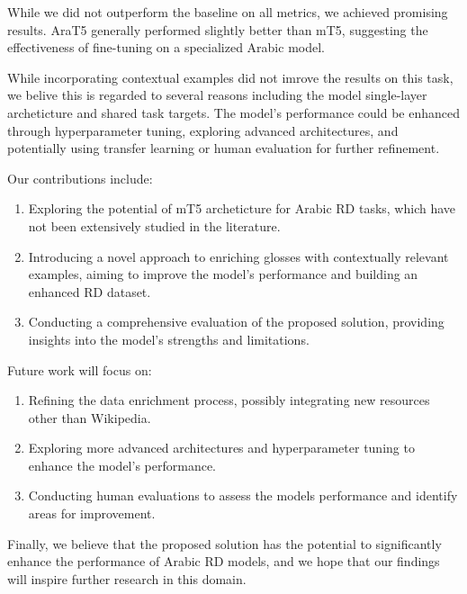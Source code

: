 \documentclass[12pt]{article}
\begin{document}
While we did not outperform the baseline on all metrics, we achieved promising results. AraT5 generally performed slightly better than mT5, suggesting the effectiveness of fine-tuning on a specialized Arabic model.

While incorporating contextual examples did not imrove the results on this task, we belive this is regarded to several reasons including the model single-layer archeticture and shared task targets. The model's performance could be enhanced through hyperparameter tuning, exploring advanced architectures, and potentially using transfer learning or human evaluation for further refinement.

Our contributions include:
\begin{enumerate}
    \item Exploring the potential of mT5 archeticture for Arabic RD tasks, which have not been extensively studied in the literature.
    \item Introducing a novel approach to enriching glosses with contextually relevant examples, aiming to improve the model's performance and building an enhanced RD dataset.
    \item Conducting a comprehensive evaluation of the proposed solution, providing insights into the model's strengths and limitations.
\end{enumerate}

Future work will focus on: 
\begin{enumerate}
    \item Refining the data enrichment process, possibly integrating new resources other than Wikipedia.
    \item Exploring more advanced architectures and hyperparameter tuning to enhance the model's performance.
    \item Conducting human evaluations to assess the models performance and identify areas for improvement.
\end{enumerate}

Finally, we believe that the proposed solution has the potential to significantly enhance the performance of Arabic RD models, and we hope that our findings will inspire further research in this domain.

\newpage

\printbibliography[title={References}]\label{lastpage}
\end{document}
